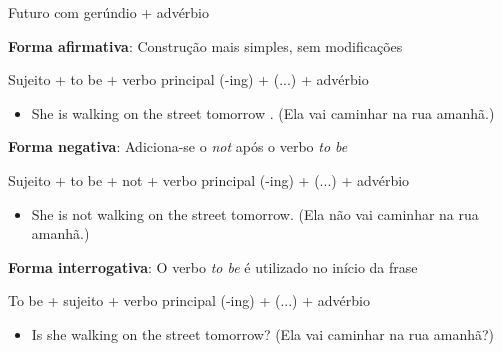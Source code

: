 \documentclass[compress,mathserif,xcolor=table]{beamer}
\begin{document}

\begin{frame}{Futuro com gerúndio + advérbio}

\textbf{Forma afirmativa}: Construção mais simples, sem modificações

Sujeito + to be + verbo principal (-ing) + (...) + advérbio
\begin{itemize}
    \item She is walking on the street tomorrow . (Ela vai caminhar na rua amanhã.)
\end{itemize}

\vspace{0.25cm}

\textbf{Forma negativa}: Adiciona-se o \textit{not} após o verbo \textit{to be}

Sujeito + to be + not + verbo principal (-ing) + (...) + advérbio
\begin{itemize}
    \item She is not walking on the street tomorrow. (Ela não vai caminhar na rua amanhã.)
\end{itemize}

\vspace{0.25cm}

\textbf{Forma interrogativa}: O verbo \textit{to be} é utilizado no início da frase

To be + sujeito + verbo principal (-ing) + (...) + advérbio
\begin{itemize}
    \item Is she walking on the street tomorrow? (Ela vai caminhar na rua amanhã?)
\end{itemize}

\end{frame}
\end{document}
